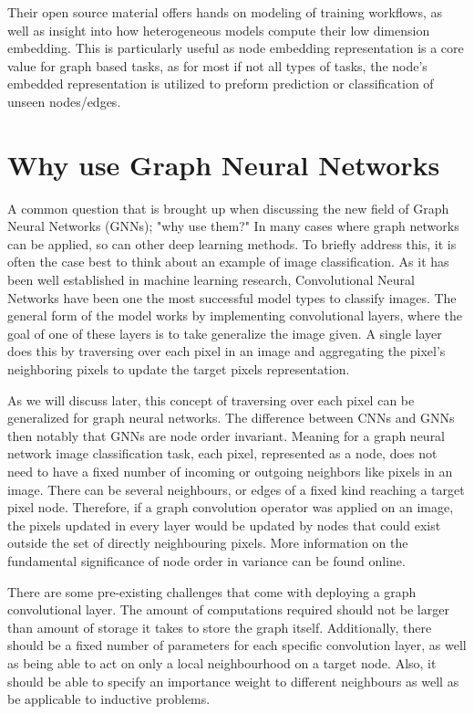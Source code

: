 Their open source material offers hands on modeling of training workflows, as well as insight into how heterogeneous models compute their low dimension embedding. This is particularly useful as node embedding representation is a core value for graph based tasks, as for most if not all types of tasks, the node's embedded representation is utilized to preform prediction or classification of unseen nodes/edges. 

\section{Why use Graph Neural Networks}

A common question that is brought up when discussing the new field of Graph Neural Networks (GNNs); "why use them?" In many cases where graph networks can be applied, so can other deep learning methods. To briefly address this, it is often the case best to think about an example of image classification. As it has been well established in machine learning research, Convolutional Neural Networks have been one the most successful model types to classify images. The general form of the model works by implementing convolutional layers, where the goal of one of these layers is to take generalize the image given. A single layer does this by traversing over each pixel in an image and aggregating the pixel's neighboring pixels to update the target pixels representation. 

As we will discuss later, this concept of traversing over each pixel can be generalized for graph neural networks. The difference between CNNs and GNNs then notably that GNNs are node order invariant. Meaning for a graph neural network image classification task, each pixel, represented as a node, does not need to have a fixed number of incoming or outgoing neighbors like pixels in an image. There can be several neighbours, or edges of a fixed kind reaching a target pixel node. Therefore, if a graph convolution operator was applied on an image, the pixels updated in every layer would be updated by nodes that could exist outside the set of directly neighbouring pixels. More information on the fundamental significance of node order in variance can be found online. \cite{sanchez2021gentle}

There are some pre-existing challenges that come with deploying a graph convolutional layer. The amount of computations required should not be larger than amount of storage it takes to store the graph itself. Additionally, there should be a fixed number of parameters for each specific convolution layer, as well as being able to act on only a local neighbourhood on a target node. Also, it should be able to specify an importance weight to different neighbours as well as be applicable to inductive problems. \cite{kipf17}


